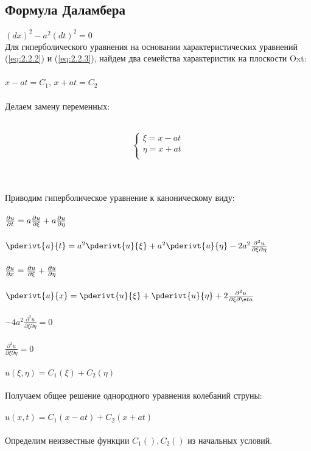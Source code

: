 \documentclass[../main.tex]{subfiles}
\begin{document}
\subsection{Формула Даламбера}
    $(dx)^2-a^2(dt)^2=0$\\
    Для гиперболического уравнения на основании характеристических уравнений (\ref{eq:2.2.2}) и (\ref{eq:2.2.3}), найдем два семейства характеристик на плоскости Oxt:\\\\
$x-at=C_1$,       $x+at=C_2$\\\\
Делаем замену переменных:\\\\
\begin{left}
$$
\left\{
\begin{array}{lcl}
\xi=x-at\\
\eta=x+at\\
\end{array}
\right.
$$
\end{left}\\\\
Приводим гиперболическое уравнение к каноническому виду:\\\\
$\frac{\partial u}{\partial t}=a\frac{\partial u}{\partial \xi}+a\frac{\partial u}{\partial \eta}$\\ \\
$\pderivt{u}{t}=a^2\pderivt{u}{\xi}+a^2\pderivt{u}{\eta}-2a^2\frac{\partial^2 u}{\partial\xi\partial\eta}$\\ \\
$\frac{\partial u}{\partial x}=\frac{\partial u}{\partial \xi}+\frac{\partial u}{\partial \eta}$\\ \\
$\pderivt{u}{x}=\pderivt{u}{\xi}+\pderivt{u}{\eta}+2\frac{\partial^2 u}{\partial\xi\partial\e ta}$\\ \\
$-4a^2\frac{\partial^2 u}{\partial\xi\partial\eta}=0$\\ \\
$\frac{\partial^2 u}{\partial\xi\partial\eta}=0$\\ \\ $u(\xi,\eta)=C_1(\xi)+C_2(\eta)$ \\ \\
Получаем общее решение однородного уравнения колебаний струны:\\\\
$u(x,t)=C_1(x-at)+C_2(x+at)$\\\\
Определим неизвестные функции $C_1(), C_2()$ из начальных условий.\\\\
\end{document}
